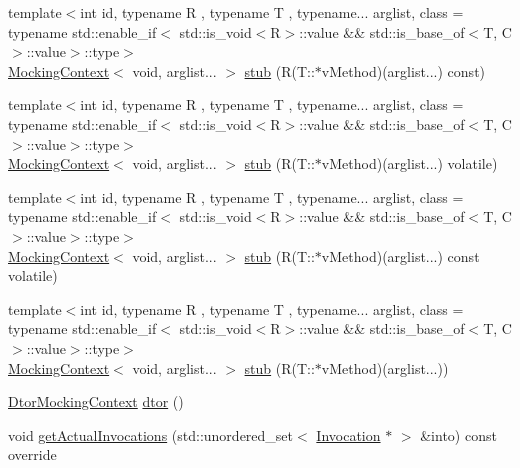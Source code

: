 \begin{DoxyCompactItemize}
\item 
{\footnotesize template$<$int id, typename R , typename T , typename... arglist, class  = typename std\+::enable\+\_\+if$<$                std\+::is\+\_\+void$<$\+R$>$\+::value \&\& std\+::is\+\_\+base\+\_\+of$<$\+T, C$>$\+::value$>$\+::type$>$ }\\\mbox{\hyperlink{classfakeit_1_1MockingContext}{Mocking\+Context}}$<$ void, arglist... $>$ \mbox{\hyperlink{classfakeit_1_1Mock_a1861b19f93de559fc183139f1ecdfa6b}{stub}} (R(T\+::$\ast$v\+Method)(arglist...) const)
\item 
{\footnotesize template$<$int id, typename R , typename T , typename... arglist, class  = typename std\+::enable\+\_\+if$<$                std\+::is\+\_\+void$<$\+R$>$\+::value \&\& std\+::is\+\_\+base\+\_\+of$<$\+T, C$>$\+::value$>$\+::type$>$ }\\\mbox{\hyperlink{classfakeit_1_1MockingContext}{Mocking\+Context}}$<$ void, arglist... $>$ \mbox{\hyperlink{classfakeit_1_1Mock_a8bb1a9ff231e91407f6dea872e2c4a4f}{stub}} (R(T\+::$\ast$v\+Method)(arglist...) volatile)
\item 
{\footnotesize template$<$int id, typename R , typename T , typename... arglist, class  = typename std\+::enable\+\_\+if$<$                std\+::is\+\_\+void$<$\+R$>$\+::value \&\& std\+::is\+\_\+base\+\_\+of$<$\+T, C$>$\+::value$>$\+::type$>$ }\\\mbox{\hyperlink{classfakeit_1_1MockingContext}{Mocking\+Context}}$<$ void, arglist... $>$ \mbox{\hyperlink{classfakeit_1_1Mock_a22b83b574e4db2689c8a1f3375554035}{stub}} (R(T\+::$\ast$v\+Method)(arglist...) const volatile)
\item 
{\footnotesize template$<$int id, typename R , typename T , typename... arglist, class  = typename std\+::enable\+\_\+if$<$                std\+::is\+\_\+void$<$\+R$>$\+::value \&\& std\+::is\+\_\+base\+\_\+of$<$\+T, C$>$\+::value$>$\+::type$>$ }\\\mbox{\hyperlink{classfakeit_1_1MockingContext}{Mocking\+Context}}$<$ void, arglist... $>$ \mbox{\hyperlink{classfakeit_1_1Mock_aeedcaacc82d12295f11c3fc454b75554}{stub}} (R(T\+::$\ast$v\+Method)(arglist...))
\item 
\mbox{\hyperlink{classfakeit_1_1DtorMockingContext}{Dtor\+Mocking\+Context}} \mbox{\hyperlink{classfakeit_1_1Mock_a5c25c5db6e0e1b955137a1330f7348b9}{dtor}} ()
\item 
void \mbox{\hyperlink{classfakeit_1_1Mock_a107ca653b36eb6f72bf9d5acb13c26d8}{get\+Actual\+Invocations}} (std\+::unordered\+\_\+set$<$ \mbox{\hyperlink{structfakeit_1_1Invocation}{Invocation}} $\ast$ $>$ \&into) const override

\end{DoxyCompactItemize}
